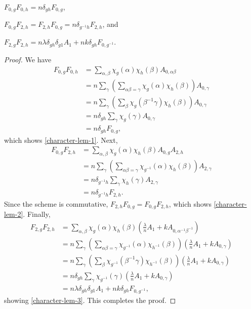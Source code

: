 \documentclass[../../../main]{subfiles}
\begin{document}
\begin{lem}
 \begin{defenum}
  \item[]
  \item\label{character-lem-1} $F_{0,g}F_{0,h} = n\delta_{gh}F_{0,g}$,
  \item\label{character-lem-2} $F_{0,g}F_{2,h} = F_{2,h}F_{0,g} = n\delta_{g^{-1}h}F_{2,h}$, and
  \item\label{character-lem-3} $F_{2,g}F_{2,h} = n\lambda\delta_{gh}\delta_{g1}A_1 + nk\delta_{gh}F_{0,g^{-1}}$.
 \end{defenum}
\end{lem}

\begin{proof}
 We have
 \begin{align*}
  F_{0,g}F_{0,h} &= \sum_{\alpha,\beta} \chi_g(\alpha)\chi_h(\beta)A_{0,\alpha\beta} \\
  &= n\sum_\gamma\left(\sum_{\alpha\beta = \gamma} \chi_g(\alpha)\chi_h(\beta)\right) A_{0,\gamma} \\
  &= n\sum_\gamma\left(\sum_\beta\chi_g(\beta^{-1}\gamma)\chi_h(\beta)\right)A_{0,\gamma} \\
  &= n\delta_{gh}\sum_\gamma\chi_g(\gamma)A_{0,\gamma} \\
  &= n\delta_{gh}F_{0,g},
 \end{align*}
 which shows \ref{character-lem-1}. Next,
 \begin{align*}
  F_{0,g}F_{2,h} &= \sum_{\alpha,\beta} \chi_g(\alpha)\chi_h(\beta)A_{0,g}A_{2,h} \\
  &= n\sum_\gamma\left(\sum_{\alpha\beta=\gamma}\chi_{g^{-1}}(\alpha)\chi_h(\beta)\right)A_{2,\gamma} \\
  &= n\delta_{g^{-1}h}\sum_\gamma\chi_h(\gamma)A_{2,\gamma} \\
  &= n\delta_{g^{-1}h}F_{2,h}.
 \end{align*}
 Since the scheme is commutative, $F_{2,h}F_{0,g} = F_{0,g}F_{2,h}$, which shows \ref{character-lem-2}. Finally, 
 \begin{align*}
  F_{2,g}F_{2,h} &= \sum_{\alpha,\beta} \chi_g(\alpha)\chi_h(\beta)\left(\frac{\lambda}{n}A_1 + kA_{0,\alpha^{-1}\beta^{-1}}\right) \\
  &= n\sum_\gamma\left(\sum_{\alpha\beta=\gamma}\chi_{g^{-1}}(\alpha)\chi_{h^{-1}}(\beta)\right)\left(\frac{\lambda}{n}A_1 + kA_{0,\gamma}\right) \\
  &= n\sum_\gamma\left(\sum_{\beta}\chi_{g^{-1}}(\beta^{-1}\gamma)\chi_{h^{-1}}(\beta)\right)\left(\frac{\lambda}{n}A_1 + kA_{0,\gamma}\right) \\
  &= n\delta_{gh}\sum_\gamma\chi_{g^{-1}}(\gamma)\left(\frac{\lambda}{n}A_1 + kA_{0,\gamma}\right) \\
  &= n\lambda\delta_{gh}\delta_{g1}A_1 + nk\delta_{gh}F_{0,g^{-1}},
 \end{align*}
 showing \ref{character-lem-3}. This completes the proof.
\end{proof}
\end{document}
